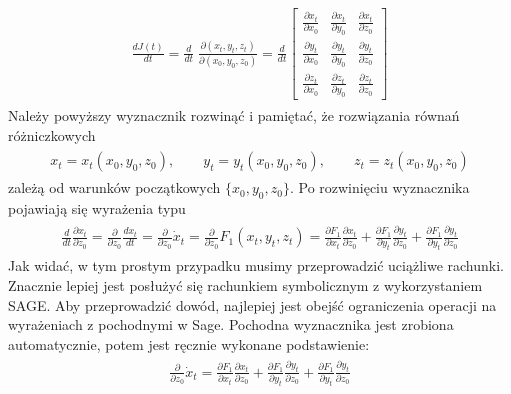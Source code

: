 \documentclass[a4paper,12pt,polish]{sphinxmanual}
\begin{document}
\label{ch1/chI022:equation-eqn28}\begin{gather}
\begin{split} \frac{ dJ(t)}{dt} = \frac{d}{dt} \; \frac{\partial (x_t, y_t, z_t)}{\partial (x_0, y_0, z_0)} = \frac{d}{dt}  \begin{bmatrix}\frac{ \partial x_t}{\partial x_0}& \frac{\partial x_t}{\partial y_0}&\frac{ \partial x_t}{\partial z_0}\\ \frac{ \partial y_t}{\partial x_0}&  \frac{ \partial y_t}{\partial y_0} &\frac{ \partial y_t}{\partial z_0} \\ \frac{ \partial z_t}{\partial x_0}& \frac{ \partial z_t}{\partial y_0}&\frac{ \partial z_t}{\partial z_0} \end{bmatrix}\end{split}\label{ch1/chI022-eqn28}
\end{gather}
Należy powyższy wyznacznik rozwinąć i pamiętać, że rozwiązania równań różniczkowych
\label{ch1/chI022:equation-eqn29}\begin{gather}
\begin{split}x_t = x_t(x_0, y_0, z_0), \qquad y_t = y_t(x_0, y_0, z_0), \qquad z_t = z_t(x_0, y_0, z_0)\end{split}\label{ch1/chI022-eqn29}
\end{gather}
zależą od warunków początkowych $\{x_0, y_0, z_0\}$.  Po rozwinięciu wyznacznika pojawiają się wyrażenia typu
\label{ch1/chI022:equation-eqn30}\begin{gather}
\begin{split}\frac{d}{dt}  \frac{ \partial x_t}{\partial z_0} = \frac{ \partial }{\partial z_0} \frac{dx_t}{dt} = \frac{ \partial }{\partial z_0} \dot x_t = \frac{ \partial }{\partial z_0} F_1(x_t, y_t, z_t) = \frac{ \partial F_1}{\partial x_t}  \frac{ \partial x_t}{\partial z_0} +  \frac{ \partial F_1}{\partial y_t}  \frac{ \partial y_t}{\partial z_0}  +\frac{ \partial F_1}{\partial y_t}  \frac{ \partial y_t}{\partial z_0}\end{split}\label{ch1/chI022-eqn30}
\end{gather}
Jak widać, w tym prostym przypadku musimy przeprowadzić uciążliwe rachunki. Znacznie
lepiej jest posłużyć się rachunkiem symbolicznym z wykorzystaniem SAGE. Aby przeprowadzić
dowód, najlepiej jest obejść ograniczenia operacji na wyrażeniach z pochodnymi w Sage.
Pochodna wyznacznika jest zrobiona automatycznie, potem jest ręcznie wykonane podstawienie:
\label{ch1/chI022:equation-eqn31}\begin{gather}
\begin{split} \frac{ \partial }{\partial z_0} \dot x_t = \frac{ \partial F_1}{\partial x_t}  \frac{ \partial x_t}{\partial z_0} +  \frac{ \partial F_1}{\partial y_t}  \frac{ \partial y_t}{\partial z_0}  +\frac{ \partial F_1}{\partial y_t}  \frac{ \partial y_t}{\partial z_0}\end{split}\label{ch1/chI022-eqn31}
\end{gather}
\end{document}
